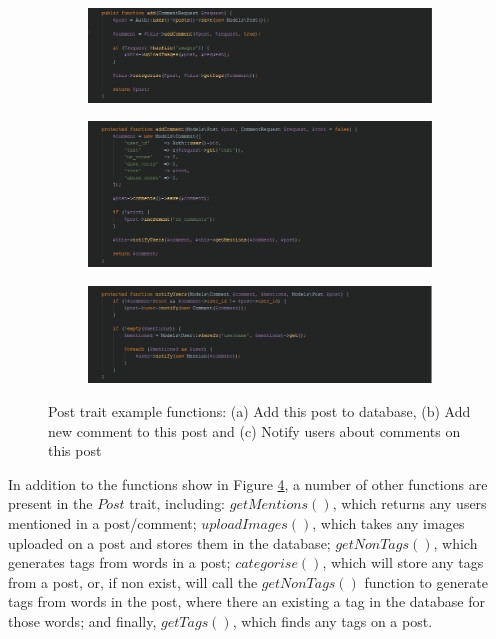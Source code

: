 \begin{figure}[H]
\centering
\begin{subfigure}[b]{1\linewidth}
	\includegraphics[width=\textwidth]{Images/Implementation/PostTraitAdd}
	\caption{}
	\label{fig:PostTraitAdd}
\end{subfigure}
\begin{subfigure}[b]{1\linewidth}
	\includegraphics[width=\textwidth]{Images/Implementation/PostTraitAddComment}
	\caption{}
	\label{fig:PostTraitAddComment}
\end{subfigure}
\begin{subfigure}[b]{1\linewidth}
	\includegraphics[width=\textwidth]{Images/Implementation/PostTraitNotifyUsers}
	\caption{}
	\label{fig:PostTraitNotifyUsers}
\end{subfigure}
\caption{Post trait example functions: (a) Add this post to database, (b) Add new comment to this post and (c) Notify users about comments on this post}
\label{fig:PostTrait}
\end{figure}

In addition to the functions show in Figure \ref{fig:PostTrait}, a number of other functions are present in the $Post$ trait, including: $getMentions()$, which returns any users mentioned in a post/comment; $uploadImages()$, which takes any images uploaded on a post and stores them in the database; $getNonTags()$, which generates tags from words in a post; $categorise()$, which will store any tags from a post, or, if non exist, will call the $getNonTags()$ function to generate tags from words in the post, where there an existing a tag in the database for those words; and finally, $getTags()$, which finds any tags on a post.

